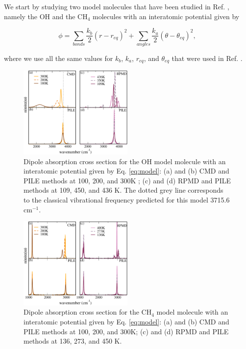 \documentclass[aps,prb,superscriptaddress,amsmath,amssymb,showpacs,twocolumn]{revtex4}
\begin{document}
We start by studying two model molecules that have been studied in Ref. \cite{witt+09jcp},
namely the OH and the CH$_4$ molecules with an interatomic potential given by

\begin{equation}
\phi=\sum_{bonds} \frac{k_b}{2} (r-r_{eq})^2 + \sum_{angles} \frac{k_a}{2}(\theta - \theta_{eq})^2,
\label{eq:model}
\end{equation}

\noindent where we use all the same values for $k_b$, $k_a$, $r_{eq}$, and $\theta_{eq}$ that were used in Ref. \cite{witt+09jcp}.

\begin{figure}[htbp]
\centering
\includegraphics[width=0.5\textwidth]{figures/comparison_oh_factors.pdf}
\caption{Dipole absorption cross section for the OH model molecule with an interatomic potential given by Eq. \ref{eq:model}: (a) and (b) CMD and PILE methods at 100, 200, and 300K ; (c)  and (d) RPMD and PILE methods at 109, 450, and 436 K. The dotted grey line corresponds to the classical vibrational frequency predicted for this model 3715.6 cm$^{-1}$.}
\label{fig:oh-rpmd-cmd-pile}
\end{figure}

\begin{figure}[htbp]
\centering
\includegraphics[width=0.5\textwidth]{figures/comparison_ch4_factors.pdf}
\caption{Dipole absorption cross section for the CH$_4$ model molecule with an interatomic potential given by Eq. \ref{eq:model}: (a) and (b) CMD and PILE methods at 100, 200, and 300K; (c) and (d) RPMD and PILE methods at 136, 273, and 450 K.}
\label{fig:ch4-rpmd-cmd-pile}
\end{figure}
\end{document}
